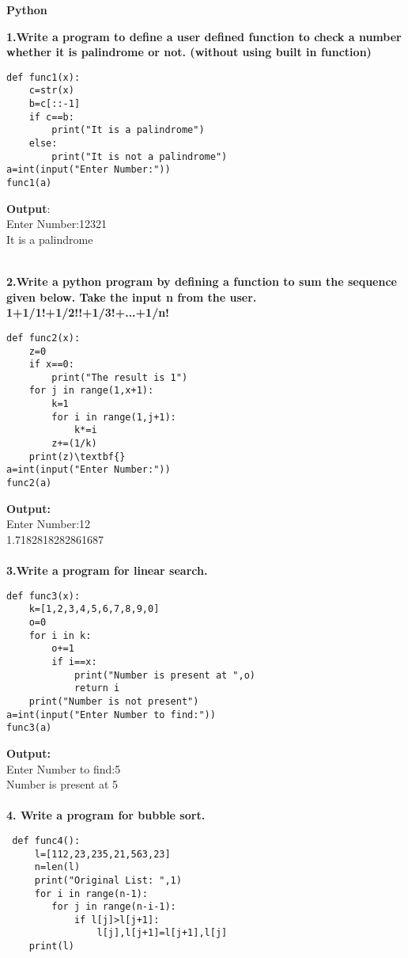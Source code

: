 \documentclass[
a4paper]{article}
\begin{document}
 \begin{center}
			\centering\LARGE\bfseries Python
		\end{center}
	\begin{large}
	    \textbf{1.Write a program to define a user defined function to check a number
whether it is palindrome or not. (without using built in function)}

\begin{verbatim}
def func1(x):
    c=str(x)
    b=c[::-1]
    if c==b:
    	print("It is a palindrome")
    else:
    	print("It is not a palindrome")
a=int(input("Enter Number:"))
func1(a)
\end{verbatim}
\textbf{Output}:\\
Enter Number:12321\\
It is a palindrome

\textbf{\\2.Write a python program by defining a function to sum the sequence given below. Take the input n from the user. 1+1/1!+1/2!!+1/3!+...+1/n!}
\begin{verbatim}
def func2(x):
    z=0
    if x==0:
        print("The result is 1")
    for j in range(1,x+1):
        k=1
        for i in range(1,j+1):
            k*=i
        z+=(1/k)
    print(z)\textbf{}          
a=int(input("Enter Number:"))
func2(a)
\end{verbatim}
\textbf{Output:\\}
Enter Number:12\\
1.7182818282861687\\
\textbf{\\3.Write a program for linear search.}
\begin{verbatim}
def func3(x):
    k=[1,2,3,4,5,6,7,8,9,0]
    o=0
    for i in k:
        o+=1
        if i==x:
            print("Number is present at ",o)
            return i
    print("Number is not present")
a=int(input("Enter Number to find:"))
func3(a)
\end{verbatim}
\textbf{Output:\\}
Enter Number to find:5\\
Number is present at  5\\
\\\textbf{4. Write a program for bubble sort.}
\begin{verbatim}
 def func4():
     l=[112,23,235,21,563,23]
     n=len(l)
     print("Original List: ",1)
     for i in range(n-1):
        for j in range(n-i-1):
            if l[j]>l[j+1]:
                l[j],l[j+1]=l[j+1],l[j]
    print(l)

\end{verbatim}
\end{large}
\end{document}
